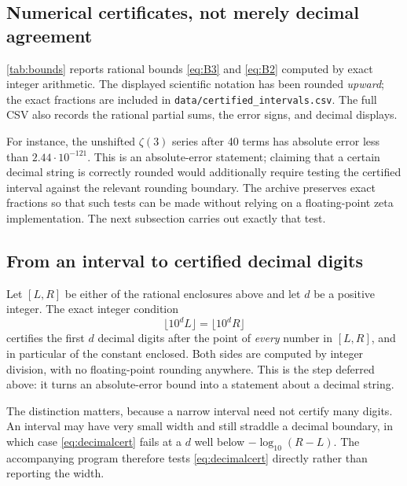 \documentclass[11pt,letterpaper]{article}
\numberwithin{equation}{section}
\theoremstyle{definition}
\begin{document}
\subsection{Numerical certificates, not merely decimal agreement}

\cref{tab:bounds} reports rational bounds \eqref{eq:B3} and \eqref{eq:B2}
computed by exact integer arithmetic. The displayed scientific notation
has been rounded \emph{upward}; the exact fractions are included in
\texttt{data/certified\_intervals.csv}. The full CSV also records the
rational partial sums, the error signs, and decimal displays.

\begin{table}[htbp]
\centering
\small
\caption{Rigorous absolute-error upper bounds after $N$ diagonal terms.
Each displayed value is rounded upward to three significant digits.}
\label{tab:bounds}

\end{table}

For instance, the unshifted $\zeta(3)$ series after 40 terms has
absolute error less than $2.44\cdot10^{-121}$. This is an absolute-error
statement; claiming that a certain decimal string is correctly rounded
would additionally require testing the certified interval against the
relevant rounding boundary. The archive preserves exact fractions so
that such tests can be made without relying on a floating-point zeta
implementation. The next subsection carries out exactly that test.

\subsection{From an interval to certified decimal digits}\label{sec:digits}

Let $[L,R]$ be either of the rational enclosures above and let $d$ be a
positive integer. The exact integer condition
\begin{equation}\label{eq:decimalcert}
 \lfloor10^dL\rfloor=\lfloor10^dR\rfloor
\end{equation}
certifies the first $d$ decimal digits after the point of \emph{every}
number in $[L,R]$, and in particular of the constant enclosed. Both sides
are computed by integer division, with no floating-point rounding
anywhere. This is the step deferred above: it turns an absolute-error
bound into a statement about a decimal string.

The distinction matters, because a narrow interval need not certify many
digits. An interval may have very small width and still straddle a
decimal boundary, in which case \eqref{eq:decimalcert} fails at a $d$
well below $-\log_{10}(R-L)$. The accompanying program therefore tests
\eqref{eq:decimalcert} directly rather than reporting the width.
\end{document}
